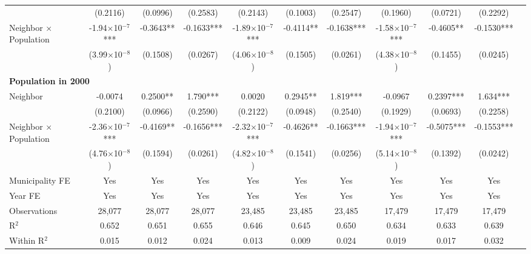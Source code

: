 \documentclass{article}
\begin{document}
\begin{table}[htbp]
\begin{adjustbox}{width=\textwidth}
\begin{tabular}{lcccccccccc}
& (0.2116) & (0.0996) & (0.2583) & (0.2143) & (0.1003) & (0.2547) & (0.1960) & (0.0721) & (0.2292) \\[0.5em]
Neighbor × Population & -1.94$\times$10$^{-7}$*** & -0.3643** & -0.1633*** & -1.89$\times$10$^{-7}$*** & -0.4114** & -0.1638*** & -1.58$\times$10$^{-7}$*** & -0.4605** & -0.1530*** \\
& (3.99$\times$10$^{-8}$) & (0.1508) & (0.0267) & (4.06$\times$10$^{-8}$) & (0.1505) & (0.0261) & (4.38$\times$10$^{-8}$) & (0.1455) & (0.0245) \\[1em]
\multicolumn{10}{l}{\textbf{Population in 2000}} \\[0.5em]
Neighbor & -0.0074 & 0.2500** & 1.790*** & 0.0020 & 0.2945** & 1.819*** & -0.0967 & 0.2397*** & 1.634*** \\
& (0.2100) & (0.0966) & (0.2590) & (0.2122) & (0.0948) & (0.2540) & (0.1929) & (0.0693) & (0.2258) \\[0.5em]
Neighbor × Population & -2.36$\times$10$^{-7}$*** & -0.4169** & -0.1656*** & -2.32$\times$10$^{-7}$*** & -0.4626** & -0.1663*** & -1.94$\times$10$^{-7}$*** & -0.5075*** & -0.1553*** \\
& (4.76$\times$10$^{-8}$) & (0.1594) & (0.0261) & (4.82$\times$10$^{-8}$) & (0.1541) & (0.0256) & (5.14$\times$10$^{-8}$) & (0.1392) & (0.0242) \\
\midrule
Municipality FE & Yes & Yes & Yes & Yes & Yes & Yes & Yes & Yes & Yes \\
Year FE & Yes & Yes & Yes & Yes & Yes & Yes & Yes & Yes & Yes \\
\midrule
Observations & 28,077 & 28,077 & 28,077 & 23,485 & 23,485 & 23,485 & 17,479 & 17,479 & 17,479 \\
R$^2$ & 0.652 & 0.651 & 0.655 & 0.646 & 0.645 & 0.650 & 0.634 & 0.633 & 0.639 \\
Within R$^2$ & 0.015 & 0.012 & 0.024 & 0.013 & 0.009 & 0.024 & 0.019 & 0.017 & 0.032 \\
\bottomrule
\end{tabular}
\end{adjustbox}
\end{table}
\end{document}
